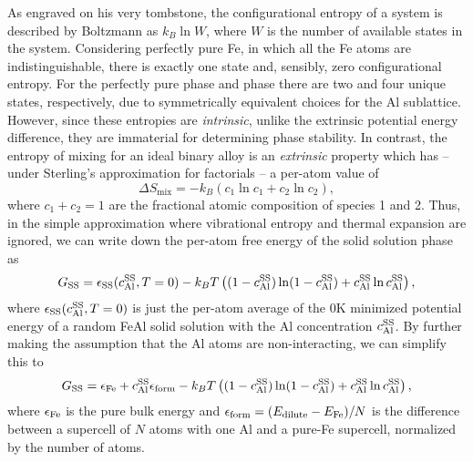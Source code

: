 As engraved on his very tombstone, the configurational entropy of a system is described by Boltzmann as $k_{B} \ln W$, where $W$ is the number of available states in the system.
Considering perfectly pure Fe, in which all the Fe atoms are indistinguishable, there is exactly one state and, sensibly, zero configurational entropy.
For the perfectly pure \BTWO phase and \DOTHREE phase there are two and four unique states, respectively, due to symmetrically equivalent choices for the Al sublattice.
However, since these entropies are \emph{intrinsic}, unlike the extrinsic potential energy difference, they are immaterial for determining phase stability.
In contrast, the entropy of mixing for an ideal binary alloy is an \emph{extrinsic} property which has -- under Sterling's approximation for factorials -- a per-atom value of
%
\begin{equation}
    \label{eq:mixing}
    \Delta S_{\mathrm{mix}} = -k_B \left(c_1 \ln c_1 + c_2 \ln c_2 \right),
\end{equation}
%
where $c_1 + c_2 = 1$ are the fractional atomic composition of species 1 and 2.
Thus, in the simple approximation where vibrational entropy and thermal expansion are ignored, we can write down the per-atom free energy of the solid solution phase as
%
\begin{equation}
    \label{eq:solid_solution_simple}
    G_{\mathrm{SS}} = \epsilon_{\mathrm{SS}}(c_{\mathrm{Al}}^{\mathrm{SS}}, T=0) -k_B T \left( (1-c_{\mathrm{Al}}^{\mathrm{SS}})\ln(1 - c_{\mathrm{Al}}^{\mathrm{SS}}) + c_{\mathrm{Al}}^{\mathrm{SS}}\ln c_{\mathrm{Al}}^{\mathrm{SS}} \right),
\end{equation}
%
where $\epsilon_{\mathrm{SS}}(c_{\mathrm{Al}}^{\mathrm{SS}}, T=0)$ is just the per-atom average of the 0K minimized potential energy of a random FeAl solid solution with the Al concentration $c_{\mathrm{Al}}^{\mathrm{SS}}$.
By further making the assumption that the Al atoms are non-interacting, we can simplify this to
\begin{equation}
    \label{eq:solid_solution_super_simple}
    G_{\mathrm{SS}} = \epsilon_{\mathrm{Fe}} + c_{\mathrm{Al}}^{\mathrm{SS}} \epsilon_{\mathrm{form}} -k_B T \left( (1-c_{\mathrm{Al}}^{\mathrm{SS}})\ln(1 - c_{\mathrm{Al}}^{\mathrm{SS}}) + c_{\mathrm{Al}}^{\mathrm{SS}}\ln c_{\mathrm{Al}}^{\mathrm{SS}} \right),
\end{equation}
%
where $\epsilon_{\mathrm{Fe}}$ is the pure bulk energy and $\epsilon_{\mathrm{form}} = (E_{\mathrm{dilute}} - E_{\mathrm{Fe}}) / N$ is the difference between a supercell of $N$ atoms with one Al and a pure-Fe supercell, normalized by the number of atoms.

